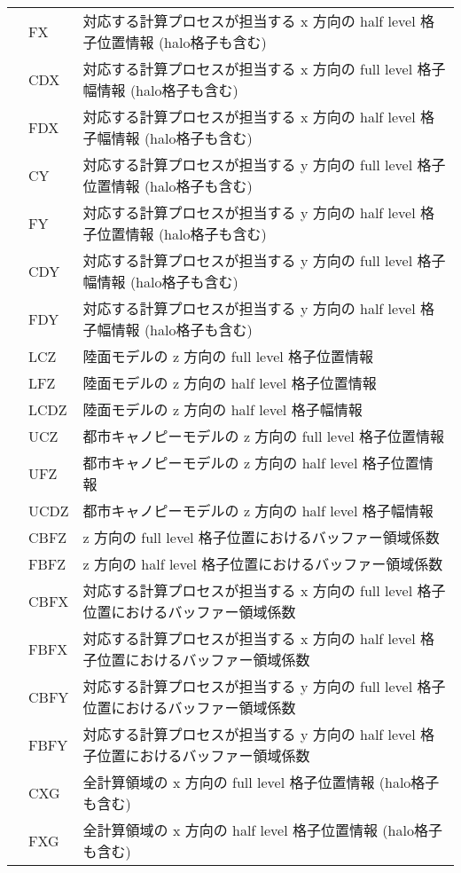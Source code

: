 \begin{longtable}{|l|ll|}
    & FX & 対応する計算プロセスが担当する x 方向の half level 格子位置情報 (halo格子も含む) \\
    & CDX & 対応する計算プロセスが担当する x 方向の full level 格子幅情報 (halo格子も含む) \\
    & FDX & 対応する計算プロセスが担当する x 方向の half level 格子幅情報 (halo格子も含む) \\
    & CY & 対応する計算プロセスが担当する y 方向の full level 格子位置情報 (halo格子も含む) \\
    & FY & 対応する計算プロセスが担当する y 方向の half level 格子位置情報 (halo格子も含む) \\
    & CDY & 対応する計算プロセスが担当する y 方向の full level 格子幅情報 (halo格子も含む) \\
    & FDY & 対応する計算プロセスが担当する y 方向の half level 格子幅情報 (halo格子も含む) \\
    & LCZ & 陸面モデルの z 方向の full level 格子位置情報 \\
    & LFZ & 陸面モデルの z 方向の half level 格子位置情報 \\
    & LCDZ & 陸面モデルの z 方向の half level 格子幅情報 \\
    & UCZ & 都市キャノピーモデルの z 方向の full level 格子位置情報 \\
    & UFZ & 都市キャノピーモデルの z 方向の half level 格子位置情報 \\
    & UCDZ & 都市キャノピーモデルの z 方向の half level 格子幅情報 \\
    & CBFZ & z 方向の full level 格子位置におけるバッファー領域係数 \\
    & FBFZ & z 方向の half level 格子位置におけるバッファー領域係数 \\
    & CBFX & 対応する計算プロセスが担当する x 方向の full level 格子位置におけるバッファー領域係数 \\
    & FBFX & 対応する計算プロセスが担当する x 方向の half level 格子位置におけるバッファー領域係数 \\
    & CBFY & 対応する計算プロセスが担当する y 方向の full level 格子位置におけるバッファー領域係数 \\
    & FBFY & 対応する計算プロセスが担当する y 方向の half level 格子位置におけるバッファー領域係数 \\
    & CXG & 全計算領域の x 方向の full level 格子位置情報 (halo格子も含む) \\
    & FXG & 全計算領域の x 方向の half level 格子位置情報 (halo格子も含む) \\

\end{longtable}
